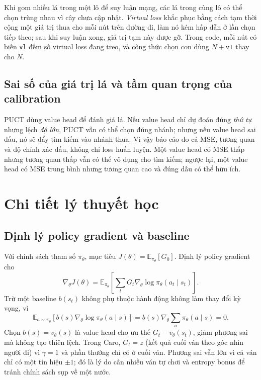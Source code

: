 Khi gom nhiều lá trong một lô để suy luận mạng, các lá trong cùng lô có thể chọn trùng nhau vì
cây chưa cập nhật. \emph{Virtual loss} khắc phục bằng cách tạm thời cộng một giá trị thua cho
mỗi nút trên đường đi, làm nó kém hấp dẫn ở lần chọn tiếp theo; sau khi suy luận xong, giá trị
tạm này được gỡ. Trong code, mỗi nút có biến \texttt{vl} đếm số virtual loss đang treo, và công
thức chọn con dùng $N+\texttt{vl}$ thay cho $N$.

\subsection{Sai số của giá trị lá và tầm quan trọng của calibration}
\label{sec:lt-calibration}
PUCT dùng value head để đánh giá lá. Nếu value head chỉ dự đoán đúng \emph{thứ tự} nhưng lệch
\emph{độ lớn}, PUCT vẫn có thể chọn đúng nhánh; nhưng nếu value head sai dấu, nó sẽ đẩy tìm kiếm
vào nhánh thua. Vì vậy báo cáo đo cả MSE, tương quan và độ chính xác dấu, không chỉ loss huấn
luyện. Một value head có MSE thấp nhưng tương quan thấp vẫn có thể vô dụng cho tìm kiếm; ngược
lại, một value head có MSE trung bình nhưng tương quan cao và đúng dấu có thể hữu ích.

\section{Chi tiết lý thuyết học}
\label{sec:lt-hoc}
\subsection{Định lý policy gradient và baseline}
\label{sec:lt-pg}
Với chính sách tham số $\pi_\theta$, mục tiêu $J(\theta)=\mathbb{E}_{\pi_\theta}[G_0]$. Định lý
policy gradient cho
\begin{equation}
  \nabla_\theta J(\theta) = \mathbb{E}_{\pi_\theta}\left[\sum_t G_t \nabla_\theta \log \pi_\theta(a_t\mid s_t)\right].
  \label{eq:pg}
\end{equation}
Trừ một baseline $b(s_t)$ không phụ thuộc hành động không làm thay đổi kỳ vọng, vì
\begin{equation}
  \mathbb{E}_{a\sim\pi_\theta}\left[b(s)\nabla_\theta\log\pi_\theta(a\mid s)\right]
  = b(s)\nabla_\theta\sum_a \pi_\theta(a\mid s)=0.
  \label{eq:baseline}
\end{equation}
Chọn $b(s)=v_\theta(s)$ là value head cho ưu thế $G_t-v_\theta(s_t)$, giảm phương sai mà không
tạo thiên lệch. Trong Caro, $G_t=z$ (kết quả cuối ván theo góc nhìn người đi) vì $\gamma=1$ và
phần thưởng chỉ có ở cuối ván. Phương sai vẫn lớn vì cả ván chỉ có một tín hiệu $\pm1$; đó là
lý do cần nhiều ván tự chơi và entropy bonus để tránh chính sách sụp về một nước.

